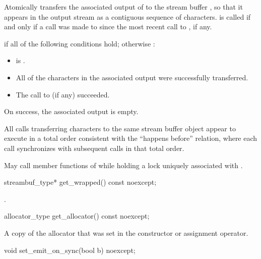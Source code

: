\begin{itemdescr}
\pnum
\effects
Atomically transfers the associated output of 
to the stream buffer ,
so that it appears in the output stream
as a contiguous sequence of characters.
 is called
if and only if a call was made to 
since the most recent call to , if any.

\pnum
\returns
{} if all of the following conditions hold;
otherwise :
\begin{itemize}
\item {} is .
\item All of the characters in the associated output were successfully transferred.
\item The call to  (if any) succeeded.
\end{itemize}

\pnum
\ensures
On success, the associated output is empty.

\pnum
\sync
All  calls transferring characters
to the same stream buffer object
appear to execute in a total order
consistent with the ``happens before'' relation,
where each  call
synchronizes with
subsequent  calls in that total order.

\pnum
\remarks
May call member functions of 
while holding a lock uniquely associated with .
\end{itemdescr}

%
\begin{itemdecl}
streambuf_type* get_wrapped() const noexcept;
\end{itemdecl}

\begin{itemdescr}
\pnum
\returns
{}.
\end{itemdescr}

%
\begin{itemdecl}
allocator_type get_allocator() const noexcept;
\end{itemdecl}

\begin{itemdescr}
\pnum
\returns
A copy of the allocator that was set in the constructor or assignment operator.
\end{itemdescr}

%
\begin{itemdecl}
void set_emit_on_sync(bool b) noexcept;
\end{itemdecl}

